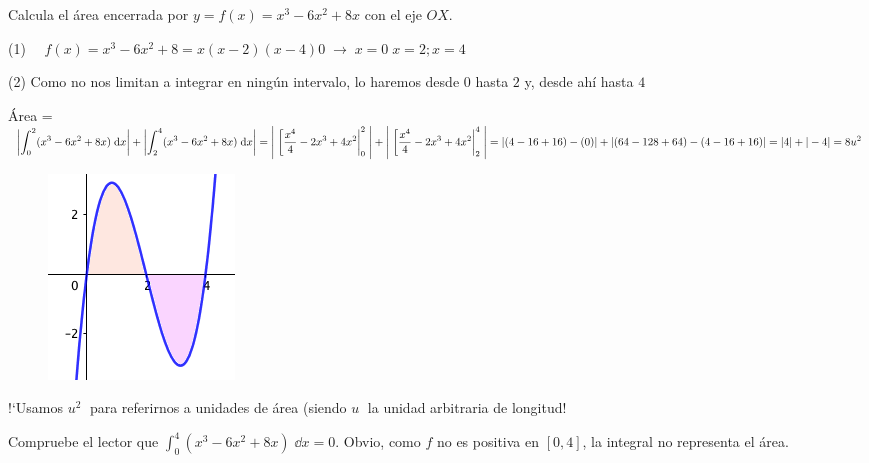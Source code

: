 \begin{ejem}
Calcula el área encerrada por $y=f(x)=x^3-6x^2+8x$ con el eje $OX$.	

(1) $\quad f(x)=x^3-6x^2+8=x(x-2)(x-4)0 \; \to \;   x=0\; x=2; x=4$

(2) Como no nos limitan a integrar en ningún intervalo, lo haremos desde $0$ hasta $2$ y, desde ahí hasta $4$

\begin{multicols}{2}
Área = $\; \displaystyle \left| \int_0^2 (x^3-6x^2+8x)\; \dd x  \right| +  \left| \int_2^4 (x^3-6x^2+8x)\; \dd x  \right| =\left|\;  \eval[\dfrac {x^4}{4}-2 x^3+4x^2|_0^2 \; \right| + \left|\;  \eval[\dfrac {x^4}{4}-2 x^3+4x^2|_2^4 \; \right| = \left| (4-16+16)-(0) \right| + \left| (64-128+64)-(4-16+16) \right|= |4|+|-4|=8 u^2$


\begin{figure}[H]
 		\centering
		\includegraphics[width=.25\textwidth]{imagenes/imagenes08/T08IM15.png}
	\end{figure}
\end{multicols}

!`Usamos $u^2\;$ para referirnos a unidades de área (siendo $u\;$ la unidad arbitraria de longitud!

\textcolor{gris}{Compruebe el lector que $\displaystyle \int_0^4 (x^3-6x^2+8x)\; \dd x =0$. Obvio, como $f$ no es positiva en $[0,4]$, la integral no representa el área. }
\end{ejem}

